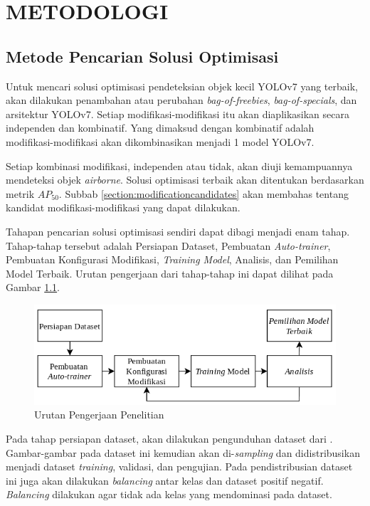 \chapter{METODOLOGI}
\section{Metode Pencarian Solusi Optimisasi}
  Untuk mencari solusi optimisasi pendeteksian objek kecil YOLOv7 yang terbaik, akan dilakukan penambahan atau perubahan \emph{bag-of-freebies}, \emph{bag-of-specials}, dan arsitektur YOLOv7.
  Setiap modifikasi-modifikasi itu akan diaplikasikan secara independen dan kombinatif.
  Yang dimaksud dengan kombinatif adalah modifikasi-modifikasi akan dikombinasikan menjadi 1 model YOLOv7.

  Setiap kombinasi modifikasi, independen atau tidak, akan diuji kemampuannya mendeteksi objek \emph{airborne}.
  Solusi optimisasi terbaik akan ditentukan berdasarkan metrik $AP_{50}$.
  Subbab \ref{section:modificationcandidates} akan membahas tentang kandidat modifikasi-modifikasi yang dapat dilakukan.

  Tahapan pencarian solusi optimisasi sendiri dapat dibagi menjadi enam tahap.
  Tahap-tahap tersebut adalah Persiapan Dataset, Pembuatan \emph{Auto-trainer}, Pembuatan Konfigurasi Modifikasi, \emph{Training Model}, Analisis, dan Pemilihan Model Terbaik.
  Urutan pengerjaan dari tahap-tahap ini dapat dilihat pada Gambar \ref{fig:metodologi}.
  \begin{figure}[ht]
    \centering
    \includegraphics[scale=0.8]{figures/metodologi.png}
    \caption{Urutan Pengerjaan Penelitian}
    \label{fig:metodologi}
  \end{figure}

  Pada tahap persiapan dataset, akan dilakukan pengunduhan dataset dari \textcite{aot_dataset}.
  Gambar-gambar pada dataset ini kemudian akan di-\emph{sampling} dan didistribusikan menjadi dataset \emph{training}, validasi, dan pengujian.
  Pada pendistribusian dataset ini juga akan dilakukan \emph{balancing} antar kelas dan dataset positif negatif.
  \emph{Balancing} dilakukan agar tidak ada kelas yang mendominasi pada dataset.

